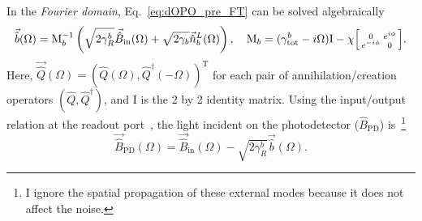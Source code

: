 In the \emph{Fourier domain}, Eq.~\ref{eq:dOPO_pre_FT} can be solved algebraically~\cite{} %
\begin{equation}
\label{eq:dOPO_FT_vectorised}
\vec{\hat b}(\Omega)=\text{M}_b^{-1}\left(\sqrt{2\gamma^b_R}\vec{\hat{B}}_\mathrm{in}(\Omega) + \sqrt{2\gamma_b}\vec{\hat{n}}^L_b(\Omega)\right),\quad\text{M}_b=(\gamma^b_\mathrm{tot}-i \Omega)\text{I}-\chi \begin{bsmallmatrix}0 & e^{i\phi} \\e^{-i\phi} & 0\end{bsmallmatrix}.
\end{equation}
Here, $\vec{\hat{Q}}(\Omega)=(\hat{Q}(\Omega),\hat{Q}^\dag(-\Omega))^\text{T}$ for each pair of annihilation/creation operators $(\hat Q, \hat Q^\dag)$, and $\text{I}$ is the 2 by 2 identity matrix.
Using the input/output relation at the readout port~\cite{}, %
the light incident on the photodetector ($\hat B_\text{PD}$) is~\footnote{I ignore the spatial propagation of these external modes because it does not affect the noise.}
\begin{equation}
\label{eq:dOPO_IO}\vec{\hat{B}}_\mathrm{PD}(\Omega)=\vec{\hat{B}}_\mathrm{in}(\Omega)-\sqrt{2\gamma^b_R}\vec{\hat b}(\Omega).
\end{equation} 
